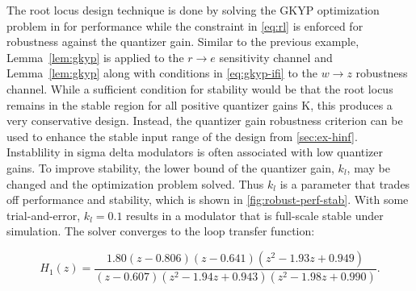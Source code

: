 The root locus design technique is done by solving the \gls{GKYP} optimization problem in for performance while the constraint in \autoref{eq:rl} is enforced for robustness against the quantizer gain. Similar to the previous example, Lemma~\ref{lem:gkyp} is applied to the $r \rightarrow e$ sensitivity channel and Lemma~\ref{lem:gkyp} along with conditions in \autoref{eq:gkyp-ifi} to the $w \rightarrow z$ robustness channel. While a sufficient condition for stability would be that the root locus remains in the stable region for all positive quantizer gains \gls{K}, this produces a very conservative design. Instead, the quantizer gain robustness criterion can be used to enhance the stable input range of the design from \autoref{sec:ex-hinf}. Instablility in sigma delta modulators is often associated with low quantizer gains. To improve stability, the lower bound of the quantizer gain, $k_l$, may be changed and the optimization problem solved. Thus $k_l$ is a parameter that trades off performance and stability, which is shown in \autoref{fig:robust-perf-stab}. With some trial-and-error, $k_l=0.1$ results in a modulator that is full-scale stable under simulation. The solver converges to the loop transfer function:

\begin{equation*}
	H_1(z) = \frac{1.80\left(z - 0.806\right)\left(z - 0.641\right)\left(z^2 - 1.93z + 0.949\right)}{\left(z - 0.607\right)\left(z^2 - 1.94z + 0.943\right)\left(z^2 - 1.98z + 0.990\right)}.
\end{equation*}

